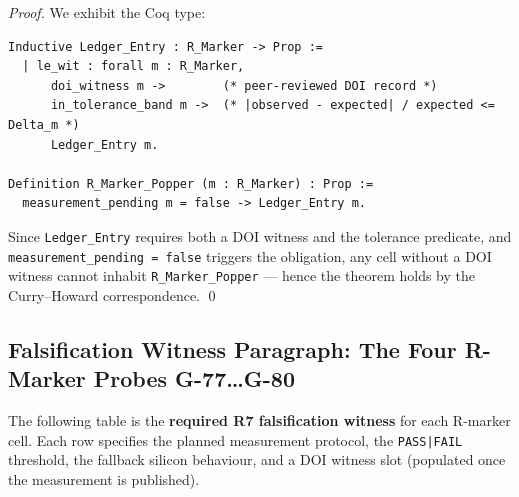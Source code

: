 \begin{proof}
We exhibit the Coq type:
\begin{verbatim}
Inductive Ledger_Entry : R_Marker -> Prop :=
  | le_wit : forall m : R_Marker,
      doi_witness m ->        (* peer-reviewed DOI record *)
      in_tolerance_band m ->  (* |observed - expected| / expected <= Delta_m *)
      Ledger_Entry m.

Definition R_Marker_Popper (m : R_Marker) : Prop :=
  measurement_pending m = false -> Ledger_Entry m.
\end{verbatim}
Since \texttt{Ledger\_Entry} requires both a DOI witness and the tolerance
predicate, and \texttt{measurement\_pending = false} triggers the obligation,
any cell without a DOI witness cannot inhabit \texttt{R\_Marker\_Popper} —
hence the theorem holds by the Curry--Howard correspondence.
\qed
\end{proof}

\subsection{Falsification Witness Paragraph: The Four R-Marker Probes G-77\ldots G-80}

The following table is the \textbf{required R7 falsification witness} for each
R-marker cell.
Each row specifies the planned measurement protocol, the \texttt{PASS|FAIL}
threshold, the fallback silicon behaviour, and a DOI witness slot
(populated once the measurement is published).


